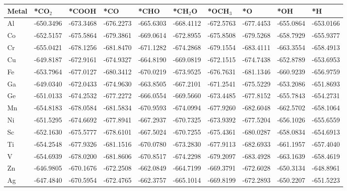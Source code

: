 \begin{table}[h]
  \centering
  {\fontsize{6}{12}\selectfont
  \begin{tabular}{*{10}{l}}
    \hline
    Metal & *CO$_2$ & *COOH    & *CO       & *CHO      & *CH$_2$O  & *OCH$_3$  & *O        & *OH       & *H        \\
    \hline
    Al & -650.3496 & -673.3468 & -676.2273 & -665.6303 & -668.4112 & -672.5763 & -677.4453 & -655.0864 & -653.0166 \\
    Co & -652.5157 & -675.5864 & -679.3861 & -669.0614 & -672.8955 & -675.8508 & -679.5268 & -658.7929 & -655.9377 \\
    Cr & -655.0421 & -678.1256 & -681.8470 & -671.1282 & -674.2868 & -679.1554 & -683.4111 & -663.3554 & -658.4913 \\
    Cu & -649.8187 & -672.9161 & -674.9327 & -664.8190 & -669.0819 & -672.1515 & -674.7438 & -652.8789 & -653.6953 \\
    Fe & -653.7964 & -677.0127 & -680.3412 & -670.0219 & -673.9525 & -676.7631 & -681.1346 & -660.9239 & -656.9759 \\
    Ga & -649.0340 & -672.0433 & -674.9630 & -663.8505 & -667.2101 & -671.2541 & -675.5229 & -653.2086 & -651.8693 \\
    Ge & -651.0133 & -674.2532 & -677.2272 & -666.0554 & -669.5660 & -673.4485 & -677.8152 & -655.7843 & -654.2731 \\
    Mn & -654.8183 & -678.0584 & -681.5834 & -670.9593 & -674.0994 & -677.9260 & -682.6048 & -662.5702 & -658.1064 \\
    Ni & -651.5295 & -674.6692 & -677.8941 & -667.2937 & -670.7325 & -673.9392 & -677.5204 & -656.1026 & -655.6559 \\
    Sc & -652.1630 & -675.5777 & -678.6101 & -667.5024 & -670.7255 & -675.4361 & -680.0287 & -658.0834 & -654.6913 \\
    Ti & -654.2548 & -677.9326 & -681.1516 & -670.0780 & -673.2830 & -677.9113 & -682.6933 & -661.1957 & -657.4040 \\
    V  & -654.6939 & -678.0200 & -681.8606 & -670.8517 & -674.2298 & -679.2097 & -683.4928 & -663.1639 & -658.4619 \\
    Zn & -646.9805 & -670.1676 & -672.2508 & -662.0849 & -664.7199 & -669.3791 & -672.6028 & -650.3134 & -648.8961 \\
    Ag & -647.4840 & -670.5954 & -672.4765 & -662.3757 & -665.1014 & -669.8199 & -672.2893 & -650.2207 & -651.5223 \\

\end{tabular}}
\end{table}
